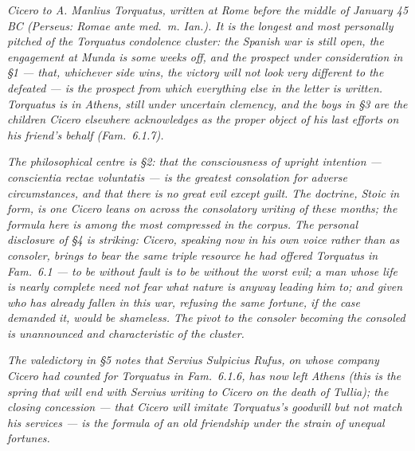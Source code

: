 
\textit{Cicero to A. Manlius Torquatus, written at Rome before
the middle of January 45 BC (Perseus: \textit{Romae ante med.~m.
Ian.}). It is the longest and most personally pitched of the
Torquatus condolence cluster: the Spanish war is still open,
the engagement at Munda is some weeks off, and the prospect
under consideration in \S 1 --- that, whichever side wins, the
victory will not look very different to the defeated --- is
the prospect from which everything else in the letter is
written. Torquatus is in Athens, still under uncertain
clemency, and the boys in \S 3 are the children Cicero
elsewhere acknowledges as the proper object of his last efforts
on his friend's behalf (\textit{Fam.}~6.1.7).}

\textit{The philosophical centre is \S 2: that the consciousness
of upright intention --- \textit{conscientia rectae voluntatis}
--- is the greatest consolation for adverse circumstances, and
that there is no great evil except guilt. The doctrine, Stoic
in form, is one Cicero leans on across the consolatory writing
of these months; the formula here is among the most compressed
in the corpus. The personal disclosure of \S 4 is striking:
Cicero, speaking now in his own voice rather than as consoler,
brings to bear the same triple resource he had offered Torquatus
in \textit{Fam.}~6.1 --- to be without fault is to be without
the worst evil; a man whose life is nearly complete need not
fear what nature is anyway leading him to; and given who has
already fallen in this war, refusing the same fortune, if the
case demanded it, would be shameless. The pivot to the consoler
becoming the consoled is unannounced and characteristic of the
cluster.}

\textit{The valedictory in \S 5 notes that Servius Sulpicius
Rufus, on whose company Cicero had counted for Torquatus in
\textit{Fam.}~6.1.6, has now left Athens (this is the spring
that will end with Servius writing to Cicero on the death of
Tullia); the closing concession --- that Cicero will imitate
Torquatus's goodwill but not match his services --- is the
formula of an old friendship under the strain of unequal
fortunes.}
